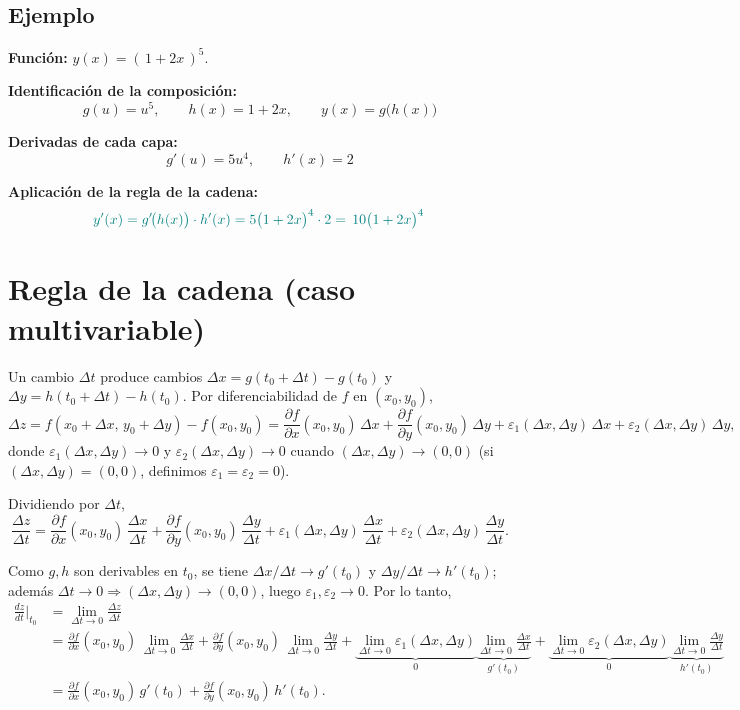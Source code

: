 \documentclass{article}
\begin{document}
\subsection*{Ejemplo}



\textbf{Función:} \(\displaystyle y(x) = (\,1+2x\,)^5\).

\textbf{Identificación de la composición:}
\[
g(u)=u^{5}, \qquad h(x)=1+2x, \qquad y(x)=g\!\big(h(x)\big)
\]

\textbf{Derivadas de cada capa:}
\[
g'(u)=5u^{4}, \qquad h'(x)=2
\]

\textbf{Aplicación de la regla de la cadena:}
\[\color{teal}
y'(x)=g'\!\big(h(x)\big)\cdot h'(x)
=5\big(1+2x\big)^{4}\cdot 2
={\,10\big(1+2x\big)^{4}\,}
\]





\section*{Regla de la cadena (caso multivariable)}


Un cambio \(\Delta t\) produce cambios \(\Delta x=g(t_0+\Delta t)-g(t_0)\) y
\(\Delta y=h(t_0+\Delta t)-h(t_0)\). Por diferenciabilidad de \(f\) en \((x_0,y_0)\),
\[
\Delta z
= f(x_0+\Delta x,\,y_0+\Delta y)-f(x_0,y_0)
= \frac{\partial f}{\partial x}(x_0,y_0)\,\Delta x
+ \frac{\partial f}{\partial y}(x_0,y_0)\,\Delta y
+ \varepsilon_1(\Delta x,\Delta y)\,\Delta x
+ \varepsilon_2(\Delta x,\Delta y)\,\Delta y,
\]
donde \(\varepsilon_1(\Delta x,\Delta y)\to 0\) y \(\varepsilon_2(\Delta x,\Delta y)\to 0\) cuando
\((\Delta x,\Delta y)\to(0,0)\) (si \((\Delta x,\Delta y)=(0,0)\), definimos \(\varepsilon_1=\varepsilon_2=0\)).

Dividiendo por \(\Delta t\),
\[
\frac{\Delta z}{\Delta t}
= \frac{\partial f}{\partial x}(x_0,y_0)\,\frac{\Delta x}{\Delta t}
+ \frac{\partial f}{\partial y}(x_0,y_0)\,\frac{\Delta y}{\Delta t}
+ \varepsilon_1(\Delta x,\Delta y)\,\frac{\Delta x}{\Delta t}
+ \varepsilon_2(\Delta x,\Delta y)\,\frac{\Delta y}{\Delta t}.
\]

Como \(g,h\) son derivables en \(t_0\), se tiene \(\Delta x/\Delta t \to g'(t_0)\) y
\(\Delta y/\Delta t \to h'(t_0)\); además \(\Delta t\to0\Rightarrow (\Delta x,\Delta y)\to(0,0)\),
luego \(\varepsilon_1,\varepsilon_2\to 0\). Por lo tanto,
\[
\begin{aligned}
\frac{dz}{dt}\Big|_{t_0}
&= \lim_{\Delta t\to0}\frac{\Delta z}{\Delta t} \\
&= \frac{\partial f}{\partial x}(x_0,y_0)\,\lim_{\Delta t\to0}\frac{\Delta x}{\Delta t}
  + \frac{\partial f}{\partial y}(x_0,y_0)\,\lim_{\Delta t\to0}\frac{\Delta y}{\Delta t}
  + \underbrace{\lim_{\Delta t\to0}\varepsilon_1(\Delta x,\Delta y)}_{0}\!
    \underbrace{\lim_{\Delta t\to0}\frac{\Delta x}{\Delta t}}_{g'(t_0)}
  + \underbrace{\lim_{\Delta t\to0}\varepsilon_2(\Delta x,\Delta y)}_{0}\!
    \underbrace{\lim_{\Delta t\to0}\frac{\Delta y}{\Delta t}}_{h'(t_0)} \\
&= \frac{\partial f}{\partial x}(x_0,y_0)\,g'(t_0)
 +  \frac{\partial f}{\partial y}(x_0,y_0)\,h'(t_0).
\end{aligned}
\]
\end{document}
